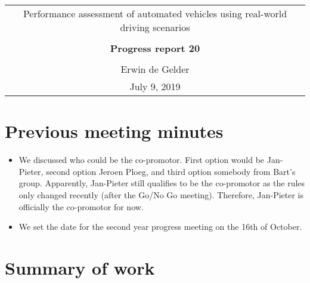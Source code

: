 \documentclass[10pt,final,a4paper,oneside,onecolumn]{article}
\newcommand{\progressreportnumber}{20}
\renewcommand{\author}{Erwin de Gelder}
\renewcommand{\date}{July 9, 2019}
\renewcommand{\title}{Performance assessment of automated vehicles using real-world driving scenarios}
\begin{document}
	
\begin{center}
	\begin{tabular}{c}
		\title \\ \\
		\textbf{\huge Progress report \progressreportnumber} \\ \\
		\author \\ 
		\date
	\end{tabular}
\end{center}

\section{Previous meeting minutes}

\begin{itemize}
	\item We discussed who could be the co-promotor. First option would be Jan-Pieter, second option Jeroen Ploeg, and third option somebody from Bart's group. Apparently, Jan-Pieter still qualifies to be the co-promotor as the rules only changed recently (after the Go/No Go meeting). Therefore, Jan-Pieter is officially the co-promotor for now.
	\item We set the date for the second year progress meeting on the 16th of October.
\end{itemize}

\section{Summary of work}
\end{document}
